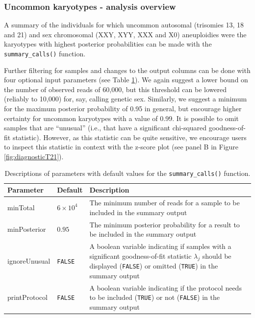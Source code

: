 \documentclass[10pt,a4paper]{article}
\begin{document}
\subsubsection{Uncommon karyotypes - analysis overview}

A summary of the individuals for which uncommon autosomal (trisomies 13, 18 and 21) and sex chromosomal (XXY, XYY, XXX and X0) aneuploidies were the karyotypes with highest posterior probabilities can be made with the \texttt{summary\_calls()} function.

Further filtering for samples and changes to the output columns can be done with four optional input parameters (see Table \ref{tab:summary_calls}). We again suggest a lower bound on the number of observed reads of 60,000, but this threshold can be lowered (reliably to 10,000) for, say, calling genetic sex. Similarly, we suggest a minimum for the maximum posterior probability of 0.95 in general, but encourage higher certainty for uncommon karyotypes with a value of 0.99. It is possible to omit samples that are “unusual” (i.e., that have a significant chi-squared goodness-of-fit statistic). However, as this statistic can be quite sensitive, we encourage users to inspect this statistic in context with the z-score plot (see panel B in Figure \ref{fig:diagnosticT21}).

\begin{table}[htbp]
    \centering
    \begin{tabular}{|m{4.5cm}|m{1.5cm}|>{\raggedright\arraybackslash}m{8.5cm}|} \hline
       \textbf{Parameter} & \textbf{Default} & \textbf{Description} \\ \hline
       minTotal & $6\times 10^{4}$ & The minimum number of reads for a sample to be included in the summary output \\ \hline
       minPosterior & $0.95$ & The minimum posterior probability for a result to be included in the summary output \\ \hline
       ignoreUnusual & \texttt{FALSE} & A boolean variable indicating if samples with a significant goodness-of-fit statistic $\lambda_j$ should be displayed (\texttt{FALSE}) or omitted (\texttt{TRUE}) in the summary output \\ \hline
       printProtocol & \texttt{FALSE} & A boolean variable indicating if the protocol needs to be included (\texttt{TRUE}) or not (\texttt{FALSE}) in the summary output \\\hline
    \end{tabular}
    \caption{Descriptions of parameters with default values for the \texttt{summary\_calls()} function.}
    \label{tab:summary_calls}
\end{table}
\end{document}

